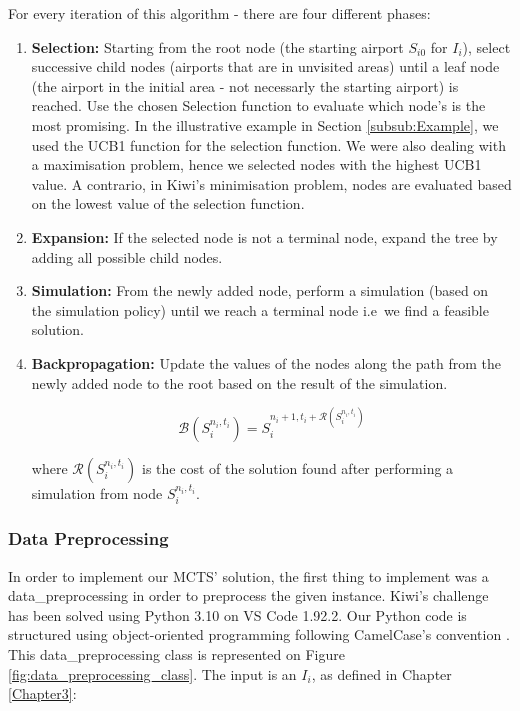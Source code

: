 For every iteration of this algorithm - there are four different phases:

\begin{enumerate}
    \item \textbf{Selection:} Starting from the root node (the starting airport $S_{i0}$ for $I_{i}$), select successive child nodes (airports that are in unvisited areas) until a leaf node (the airport in the initial area - not necessarly the starting airport) is reached. Use the chosen Selection function to evaluate which node's is the most promising. In the illustrative example in Section \ref{subsub:Example}, we used the UCB1 function for the selection function. We were also dealing with a maximisation problem, hence we selected nodes with the highest UCB1 value. A contrario, in Kiwi's minimisation problem,  nodes are evaluated based on the lowest value of the selection function.

    \item \textbf{Expansion:} If the selected node is not a terminal node, expand the tree by adding all possible child nodes.

    \item \textbf{Simulation:} From the newly added node, perform a simulation (based on the simulation policy) until we reach a terminal node i.e\ we find a feasible solution.

    \item \textbf{Backpropagation:} Update the values of the nodes along the path from the newly added node to the root based on the result of the simulation.

          \begin{equation}
              \mathcal{B}(S^{n_i,t_i}_i) = S^{n_i+1,t_i+\mathcal{R}(S^{n_i,t_i}_i)}_i
          \end{equation}

          where $\mathcal{R}(S^{n_i,t_i}_i)$ is the cost of the solution found after performing a simulation from node $S^{n_i,t_i}_i$.
\end{enumerate}


\newpage
\subsubsection{Data Preprocessing}

In order to implement our MCTS' solution, the first thing to implement was a data\_preprocessing  in order to preprocess the given instance.
Kiwi's challenge has been solved using Python 3.10 on VS Code 1.92.2. Our Python code is structured using object-oriented programming following CamelCase's convention \cite{camel_case}. This data\_preprocessing class is represented on Figure \ref{fig:data_preprocessing_class}.
The input is an  $I_i$, as defined in Chapter \ref{Chapter3}:

